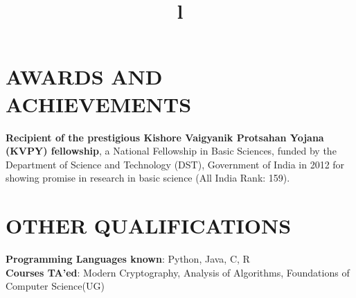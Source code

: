 \documentclass[margin]{res}
\begin{document}
\begin{resume}
\fi


\section{AWARDS AND ACHIEVEMENTS}

\textbf{Recipient of the prestigious Kishore Vaigyanik Protsahan Yojana (KVPY) fellowship}, a National Fellowship
in Basic Sciences, funded by the Department of Science and Technology (DST), Government of
India in 2012 for showing promise in research in basic science (All India Rank: 159).
\par

\section{OTHER QUALIFICATIONS}

\textbf{Programming Languages known}: Python, Java, C, R \\
\textbf{Courses TA'ed}: Modern Cryptography, Analysis of Algorithms, Foundations of Computer Science(UG)

\begin{format}
\title{l}\\
\\
\body\\
\end{format}



\iffalse
\section{RESEARCH INTERESTS}
Secure Computation, Cryptography, Algorithms, Computational Complexity, Communication Complexity, Information Theory.
\fi

\end{resume}
\end{document}
